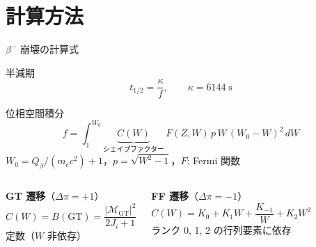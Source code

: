 \documentclass[aspectratio=169,12pt]{beamer}
\begin{document}
\section{計算方法}

\begin{frame}{$\beta^-$ 崩壊の計算式}
  \begin{block}{半減期}
    \begin{equation*}
      t_{1/2} = \frac{\kappa}{f}, \qquad \kappa = 6144\;\text{s}
    \end{equation*}
  \end{block}

  \begin{block}{位相空間積分}
    \begin{equation*}
      f = \int_1^{W_0} \underbrace{C(W)}_{\text{シェイプファクター}}\,
      F(Z,W)\, p\, W\, (W_0-W)^2\, dW
    \end{equation*}
    $W_0 = Q_\beta/(m_ec^2)+1$，$p=\sqrt{W^2-1}$，$F$: Fermi 関数
  \end{block}

  \begin{columns}
    \textbf{GT 遷移}（$\Delta\pi = +1$）
    \begin{equation*}
      C(W) = B(\text{GT}) = \frac{|\mathcal{M}_\text{GT}|^2}{2J_i+1}
    \end{equation*}
    定数（$W$ 非依存）

    \textbf{FF 遷移}（$\Delta\pi = -1$）
    \begin{equation*}
      C(W) = K_0 + K_1 W + \frac{K_{-1}}{W} + K_2 W^2
    \end{equation*}
    ランク 0, 1, 2 の行列要素に依存
  \end{columns}
\end{frame}
\end{document}
